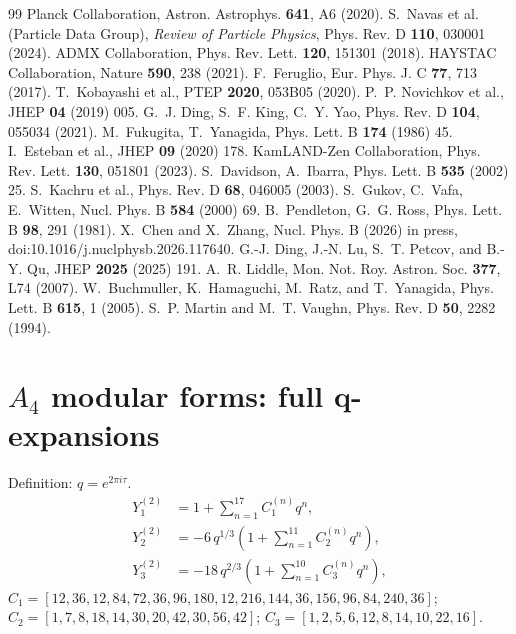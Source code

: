 \documentclass[12pt,a4paper]{article}
\numberwithin{equation}{section}
\begin{document}
\begin{thebibliography}{99}
 Planck Collaboration, Astron. Astrophys. \textbf{641}, A6 (2020).
 S.~Navas et al. (Particle Data Group), \emph{Review of Particle Physics}, Phys. Rev. D \textbf{110}, 030001 (2024).
 ADMX Collaboration, Phys. Rev. Lett. \textbf{120}, 151301 (2018).
 HAYSTAC Collaboration, Nature \textbf{590}, 238 (2021).
 F.~Feruglio, Eur. Phys. J. C \textbf{77}, 713 (2017).
 T.~Kobayashi et al., PTEP \textbf{2020}, 053B05 (2020).
 P.~P. Novichkov et al., JHEP \textbf{04} (2019) 005.
 G.~J. Ding, S.~F. King, C.~Y. Yao, Phys. Rev. D \textbf{104}, 055034 (2021).
 M.~Fukugita, T.~Yanagida, Phys. Lett. B \textbf{174} (1986) 45.
 I.~Esteban et al., JHEP \textbf{09} (2020) 178.
 KamLAND-Zen Collaboration, Phys. Rev. Lett. \textbf{130}, 051801 (2023).
 S.~Davidson, A.~Ibarra, Phys. Lett. B \textbf{535} (2002) 25.
 S.~Kachru et al., Phys. Rev. D \textbf{68}, 046005 (2003).
 S.~Gukov, C.~Vafa, E.~Witten, Nucl. Phys. B \textbf{584} (2000) 69.
 B.~Pendleton, G.~G. Ross, Phys. Lett. B \textbf{98}, 291 (1981).
 X.~Chen and X.~Zhang, Nucl. Phys. B (2026) in press, doi:10.1016/j.nuclphysb.2026.117640.
 G.-J. Ding, J.-N. Lu, S.~T. Petcov, and B.-Y. Qu, JHEP \textbf{2025} (2025) 191.
 A.~R. Liddle, Mon. Not. Roy. Astron. Soc. \textbf{377}, L74 (2007).
 W.~Buchmuller, K.~Hamaguchi, M.~Ratz, and T.~Yanagida, Phys. Lett. B \textbf{615}, 1 (2005).
 S.~P. Martin and M.~T. Vaughn, Phys. Rev. D \textbf{50}, 2282 (1994).
\end{thebibliography}

\appendix
\newpage

\section{\(A_4\) modular forms: full q-expansions}
Definition: \(q = e^{2\pi i\tau}\).
\begin{align}
Y_1^{(2)} &= 1 + \sum_{n=1}^{17} C_1^{(n)} q^n, \\
Y_2^{(2)} &= -6\, q^{1/3}\left(1 + \sum_{n=1}^{11} C_2^{(n)} q^n\right), \\
Y_3^{(2)} &= -18\, q^{2/3}\left(1 + \sum_{n=1}^{10} C_3^{(n)} q^n\right),
\end{align}
\(C_1 = [12, 36, 12, 84, 72, 36, 96, 180, 12, 216, 144, 36, 156, 96, 84, 240, 36]\);
\(C_2 = [1, 7, 8, 18, 14, 30, 20, 42, 30, 56, 42]\);
\(C_3 = [1, 2, 5, 6, 12, 8, 14, 10, 22, 16]\).
\end{document}
